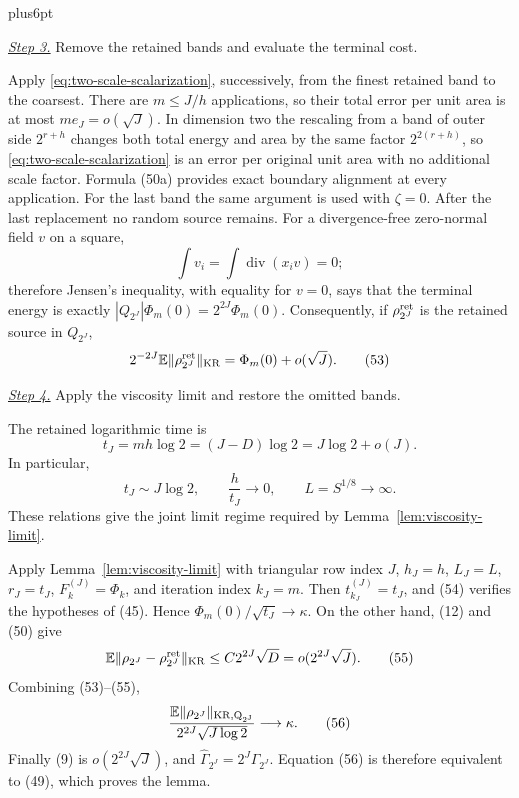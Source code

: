\documentclass[11pt,reqno]{amsart}
\makeatletter
\theoremstyle{plain}
\theoremstyle{definition}
\theoremstyle{remark}
\renewenvironment{proof}[1][\proofname]{%
  \par
  \pushQED{\qed}%
  \normalfont
  \topsep6pt plus6pt\relax
  \trivlist
  \item[\hskip\labelsep\slshape #1\@addpunct{.}]%
  \ignorespaces
}{%
  \popQED
  \endtrivlist
  \@endpefalse
}
\DeclareRobustCommand{\qed}{%
  \leavevmode\unskip\penalty9999\hbox{}\nobreak
  \ifmmode
    \makebox[0pt][l]{\qquad\hbox{\qedsymbol}}%
  \else
    \qquad\hbox{\qedsymbol}%
  \fi
}
\renewcommand{\qedsymbol}{\rule[.47pt]{4pt}{6pt}}
\numberwithin{equation}{section}
\newcommand{\1}{\mathbf 1}
\makeatother
\begin{document}
\begin{proof}
\smallskip\noindent
\underline{\textit{Step 3.}} Remove the retained bands and evaluate the terminal cost.

Apply \eqref{eq:two-scale-scalarization}, successively, from the finest retained band to the coarsest.
There are $m\leq J/h$ applications, so their total error per unit
area is at most $me_ J=o(\sqrt J)$.  In dimension two the rescaling
from a band of outer side $2^{r+h}$ changes both total energy and area
by the same factor $2^{2(r+h)}$, so \eqref{eq:two-scale-scalarization} is an error per original unit
area with no additional scale factor.  Formula (50a) provides exact
boundary alignment at every application.  For the last band the same argument is used
with $\zeta=0$.  After the last replacement no random source remains.
For a divergence-free zero-normal field $v$ on a square,
\begin{equation*}
\int v_ i=\int\operatorname {div}(x_ i v)=0;
\end{equation*}
therefore Jensen's inequality, with equality for $v=0$, says that the
terminal energy is exactly
$|Q_{2^J}|\Phi_m(0)=2^{2J}\Phi_m(0)$.  Consequently, if
$\rho_{2^J}^{\rm ret}$ is the retained source in $Q_ {2^J}$,
\begin{equation}
2^{-2J}\mathbb E\|\rho_{2^J}^{\rm ret}\|_ {\rm KR}
=\Phi_ m(0)+o(\sqrt J).
\tag{53}
\end{equation}

\smallskip\noindent
\underline{\textit{Step 4.}} Apply the viscosity limit and restore the omitted bands.

The retained logarithmic time is
\begin{equation}
t_ J=mh\log2=(J-D)\log2=J\log2+o(J).
\tag{54}
\end{equation}
In particular,
\begin{equation*}
t_J\sim J\log2,\qquad
\frac{h}{t_J}\longrightarrow0,\qquad L=S^{1/8}\longrightarrow\infty.
\end{equation*}
These relations give the joint limit regime required by
Lemma~\ref{lem:viscosity-limit}.

Apply Lemma~\ref{lem:viscosity-limit} with triangular row index $J$,
$h_J=h$, $L_J=L$, $r_J=t_J$, $F_k^{(J)}=\Phi_k$, and iteration index
$k_J=m$.  Then $t_{k_J}^{(J)}=t_J$, and (54) verifies the hypotheses
of (45).  Hence $\Phi_m(0)/\sqrt{t_J}\to\kappa$.  On the other hand,
(12) and (50) give
\begin{equation}
\mathbb E\|\rho_{2^J}-\rho_{2^J}^{\rm ret}\|_ {\rm KR}
\leq C2^{2J}\sqrt D=o(2^{2J}\sqrt J).
\tag{55}
\end{equation}
Combining (53)--(55),
\begin{equation}
\frac{\mathbb E\|\rho_{2^J}\|_ {\rm KR,Q_ {2^J}}}
{2^{2J}\sqrt{J\log2}}\longrightarrow\kappa.
\tag{56}
\end{equation}
Finally (9) is $o(2^{2J}\sqrt J)$, and
$\widehat\Gamma_ {2^J}=2^J\Gamma_ {2^J}$.  Equation (56) is therefore
equivalent to (49), which proves the lemma.

\end{proof}
\end{document}
